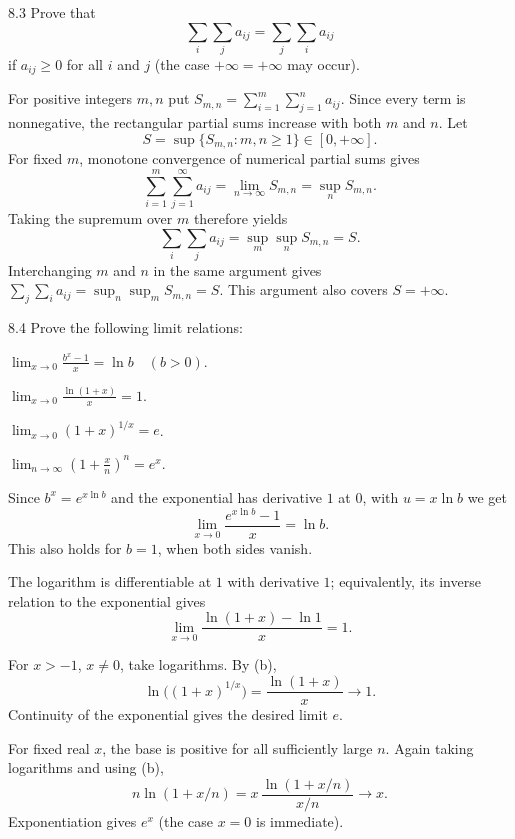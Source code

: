 \documentclass[11pt, oneside]{article}
\begin{document}
\begin{exercise}{8.3}
Prove that
\[
 \sum_i\sum_j a_{ij}=\sum_j\sum_i a_{ij}
\]
if $a_{ij}\ge0$ for all $i$ and $j$ (the case $+\infty=+\infty$ may occur).
\end{exercise}
\begin{solution}
For positive integers $m, n$ put $S_{m, n}=\sum_{i=1}^m\sum_{j=1}^n a_{ij}$. Since every term is nonnegative, the rectangular partial sums increase with both $m$ and $n$. Let
\[
 S=\sup\{S_{m, n}:m, n\ge1\}\in[0, +\infty].
\]
For fixed $m$, monotone convergence of numerical partial sums gives
\[
 \sum_{i=1}^m\sum_{j=1}^\infty a_{ij}
 =\lim_{n\to\infty}S_{m, n}=\sup_n S_{m, n}.
\]
Taking the supremum over $m$ therefore yields
\[
 \sum_i\sum_j a_{ij}=\sup_m\sup_nS_{m, n}=S.
\]
Interchanging $m$ and $n$ in the same argument gives $\sum_j\sum_i a_{ij}=\sup_n\sup_m S_{m, n}=S$. This argument also covers $S=+\infty$.
\end{solution}

\begin{exercise}{8.4}
Prove the following limit relations:
\begin{exercisesubparts}
\item $\displaystyle\lim_{x\to0}\frac{b^x-1}{x}=\ln b\quad(b>0)$.
\item $\displaystyle\lim_{x\to0}\frac{\ln(1+x)}{x}=1$.
\item $\displaystyle\lim_{x\to0}(1+x)^{1/x}=e$.
\item $\displaystyle\lim_{n\to\infty}\left(1+\frac{x}{n}\right)^n=e^x$.
\end{exercisesubparts}
\end{exercise}
\begin{solution}
\begin{exercisesubparts}
\item Since $b^x=e^{x\ln b}$ and the exponential has derivative $1$ at $0$, with $u=x\ln b$ we get
\[
 \lim_{x\to0}\frac{e^{x\ln b}-1}{x}=\ln b.
\]
This also holds for $b=1$, when both sides vanish.
\item The logarithm is differentiable at $1$ with derivative $1$; equivalently, its inverse relation to the exponential gives
\[
 \lim_{x\to0}\frac{\ln(1+x)-\ln1}{x}=1.
\]
\item For $x>-1$, $x\ne0$, take logarithms. By (b),
\[
 \ln\bigl((1+x)^{1/x}\bigr)=\frac{\ln(1+x)}x\longrightarrow1.
\]
Continuity of the exponential gives the desired limit $e$.
\item For fixed real $x$, the base is positive for all sufficiently large $n$. Again taking logarithms and using (b),
\[
 n\ln(1+x/n)=x\,\frac{\ln(1+x/n)}{x/n}\longrightarrow x.
\]
Exponentiation gives $e^x$ (the case $x=0$ is immediate).
\end{exercisesubparts}
\end{solution}
\end{document}
